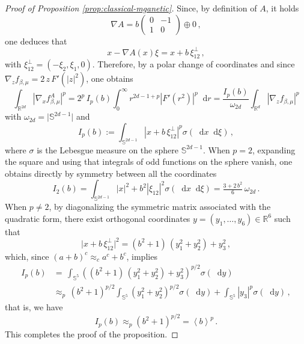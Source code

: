 \documentclass[11pt]{amsart}
\theoremstyle{plain}
\theoremstyle{definition}
\newcommand		{\RR}		{\mathbb R}			%
\newcommand		{\R}		{\RR}
\newcommand		{\Rd}		{\R^d}
\newcommand		{\Rdd}		{\R^{2d}}
\renewcommand	{\SS}		{\mathds S}			%
\newcommand		{\lt}			{\left}				%
\newcommand		{\rt}			{\right}			%
\renewcommand	{\(}			{\lt(}
\renewcommand	{\)}			{\rt)}
\newcommand		{\bangle}[1]	{\lt\langle #1\rt\rangle}
\newcommand		{\weight}[1]	{\bangle{#1}}	%
\newcommand		{\n}[1]			{\lt\lvert #1 \rt\rvert}
\renewcommand		{\d}		{\mathop{}\!\mathrm{d}}		%
\newcommand		{\intd}			{\int_{\Rd}}
\newcommand		{\intdd}		{\int_{\Rdd}}
\begin{document}
	\begin{proof}[Proof of Proposition \ref{prop:classical-mganetic}]
		Since, by definition of $A$, it holds
		\begin{equation*}
			\nabla A = b
			\begin{pmatrix}
				0 & -1\\ 1 & 0
			\end{pmatrix}
			\oplus 0 \, ,
		\end{equation*}
		one deduces that
		\begin{equation*}
			x - \nabla A(x)\xi = x + b\,\xi_{12}^\perp\,,
		\end{equation*}
		with $\xi_{12}^\perp = (-\xi_2,\xi_1,0)$. Therefore, by a polar change of coordinates and since $\nabla_z f_{\beta,\mu} = 2\,z\, F'(\n{z}^2)$, one obtains
		\begin{equation*}
				\intdd \n{\nabla_x f_{\beta, \mu}^A}^p 
				= 2^p\,I_p(b) \int_0^\infty r^{2d-1+p}\n{F'(r^2)}^p \d r = \frac{I_p(b)}{\omega_{2d}} \intd \n{\nabla_z f_{\beta,\mu}}^p
		\end{equation*}
		with $\omega_{2d} = \lvert\SS^{2d-1}\rvert$ and
		\begin{equation*}
			I_p(b) := \int_{\SS^{2d-1}} \n{x+ b\,\xi^\perp_{12}}^p \sigma(\d x \d\xi) \, ,
		\end{equation*}
		where $\sigma$ is the Lebesgue measure on the sphere $\SS^{2d-1}$. When $p=2$, expanding the square and using that integrals of odd functions on the sphere vanish, one obtains directly by symmetry between all the coordinates
		\begin{equation*}
			I_2(b) = \int_{\SS^{2d-1}} \n{x}^2 + b^2\n{\xi_{12}}^2 \sigma(\d x \d\xi) = \tfrac{3+2\,b^2}{6} \,\omega_{2d} \,.
		\end{equation*}
		When $p\neq 2$, by diagonalizing the symmetric matrix associated with the quadratic form, there exist orthogonal coordinates $y=(y_1, \ldots, y_6)\in \R^6$ such that 
		\begin{equation*}
			\lvert x+ b\,\xi^\perp_{12}\rvert^2 = (b^2+1) \, (y_1^2+y_2^2) + y_3^2\,,
		\end{equation*}
		which, since $(a+b)^c \approx_c a^c+b^c$, implies 
		\begin{align*}
			I_p(b) &=\, \int_{\mathbb{S}^5} ((b^2+1)\,(y_1^2+y_2^2)+y_3^2)^{p/2}\sigma(\d y)
			\\
			&\approx_p\,(b^2+1)^{p/2}\int_{\mathbb{S}^5} \lt(y_1^2+y_2^2\rt)^{p/2}\sigma(\d y) + \int_{\SS^5} \n{y_3}^p \sigma(\d y) \, ,
		\end{align*}
		that is, we have
		\begin{equation*}
			I_p(b) \approx_p (b^2+1)^{p/2} = \weight{b}^p\,.
		\end{equation*}
		This completes the proof of the proposition.
	\end{proof}
	
\end{document}
